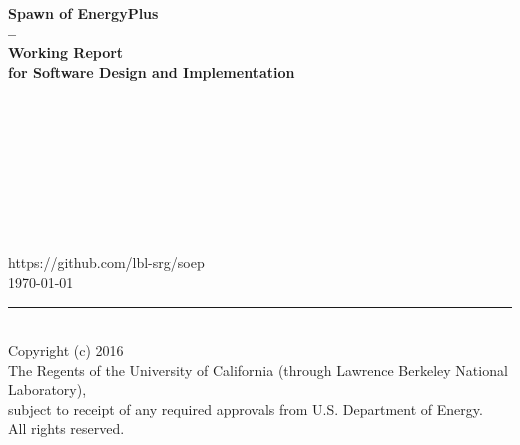\begin{titlepage}
\begin{minipage}{\headwidth}
\begin{flushright}
\vspace{-1cm}
\large{~}
\\[5mm]
\hrulefill
\\[5mm]
 \Large\sffamily\bfseries{Spawn of EnergyPlus}\\
 \Large\sffamily\bfseries{--}\\[3mm]
 \Large\sffamily\bfseries{Working Report}\\
 \Large\sffamily\bfseries{for Software Design and Implementation}
\\
\hrulefill
~\\[20mm]
\end{flushright}
\begin{center}
\large{~}\\
\large{~}\\
\large{~}\\
\large{~}\\
\large{~}\\
\large{~}\\
\large{~}\\
\large{https://github.com/lbl-srg/soep}
~\\[20mm]
\large{\today}
\\[50mm]
\end{center}
\hrule
~\\[2mm]
Copyright (c) 2016\\
The Regents of the University of California
(through Lawrence Berkeley National Laboratory),\\
subject to receipt of any required approvals from U.S. Department of Energy.\\
All rights reserved.
\end{minipage}
\end{titlepage}
